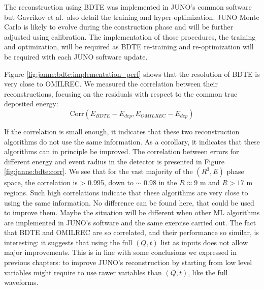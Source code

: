 \documentclass[../main.tex]{subfiles}
\begin{document}
The reconstruction using BDTE was implemented in JUNO's common software but Gavrikov et al.\ also detail the training and hyper-optimization. JUNO Monte Carlo is likely to evolve during the construction phase and will be further adjusted using calibration. The implementation of those procedures, the training and optimization, will be required as BDTE re-training and re-optimization will be required with each JUNO software update.

Figure \ref{fig:janne:bdte:implementation_perf} shows that the resolution of BDTE is very close to OMILREC. We measured the correlation between their reconstructions, focusing on the residuals with respect to the common true deposited energy:
\begin{equation}
  \label{eq:janne:bdte:corr}
\mathrm{Corr}(E_{BDTE} - E_{dep}, E_{OMILREC} - E_{dep})
\end{equation}

If the correlation is small enough, it indicates that these two reconstruction algorithms do not use the same information. As a corollary, it indicates that these algorithms can in principle be improved. The correlation between errors for different energy and event radius in the detector is presented in Figure \ref{fig:janne:bdte:corr}. We see that for the vast majority of the $(R^3, E)$ phase space, the correlation is > 0.995, down to $\sim$ 0.98 in the $R \approx 9$ m and $R > 17$ m regions. Such high correlations indicate that these algorithms are very close to using the same information. No difference can be found here, that could be used to improve them. Maybe the situation will be different when other ML algorithms are implemented in JUNO's software and the same exercise carried out. The fact that  BDTE and OMILREC are so correlated, and their performance so similar, is interesting: it suggests that using the full $(Q, t)$ list as inputs does not allow major improvements. This is in line with some conclusions we expressed in previous chapters: to improve  JUNO's reconstruction by starting from low level variables might require to use rawer variables than $(Q,t)$, like the full waveforms.
\end{document}
